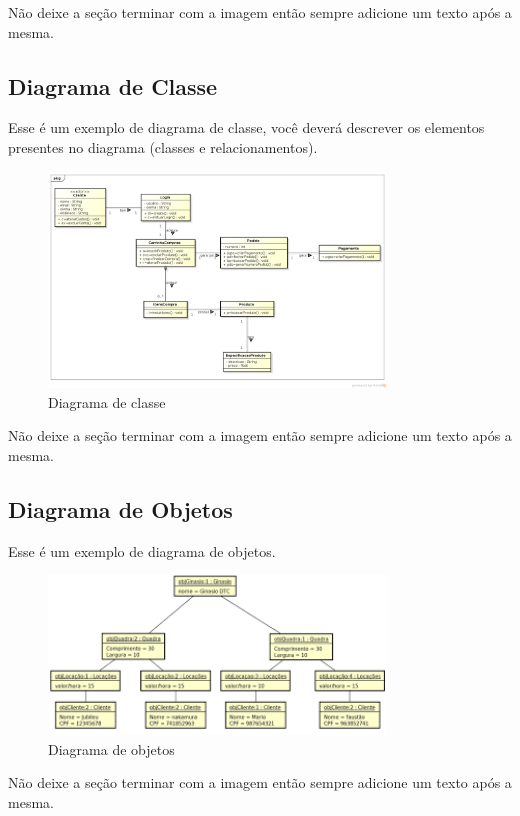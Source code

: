 \documentclass[
  a4paper,%
  12pt,%
  english,%
  brazilian,%
]{article}
\begin{document}
    Não deixe a seção terminar com a imagem então sempre adicione um texto após a mesma.
    
    \subsection*{Diagrama de Classe}

    Esse é um exemplo de diagrama de classe, você deverá descrever os elementos presentes no diagrama (classes e relacionamentos).

    \begin{figure}[h]
\centering
\caption{Diagrama de classe}%
\label{fig:diagrama-classe}
 \includegraphics[width=0.8\textwidth]{Logos/diagramaclasse.png}
\end{figure}

     Não deixe a seção terminar com a imagem então sempre adicione um texto após a mesma.

    \subsection*{Diagrama de Objetos}

Esse é um exemplo de diagrama de objetos.

        \begin{figure}[h]
\centering
\caption{Diagrama de objetos}%
\label{fig:diagrama-objetos}
 \includegraphics[width=0.8\textwidth]{Logos/diagrama_objetos.png}
\end{figure}

Não deixe a seção terminar com a imagem então sempre adicione um texto após a mesma.
\end{document}
